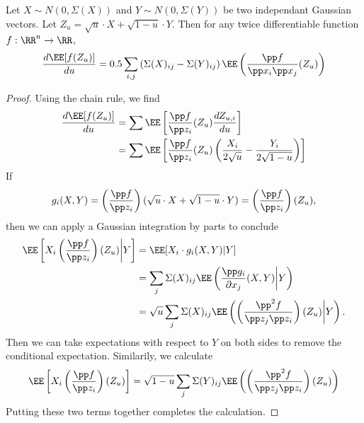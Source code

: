 \begin{lemma}
    Let $X \sim N(0,\Sigma(X))$ and $Y \sim N(0,\Sigma(Y))$ be two independant Gaussian vectors. Let $Z_u = \sqrt{u} \cdot X + \sqrt{1-u} \cdot Y$. Then for any twice differentiable function $f: \RR^n \to \RR$,
    \[ \frac{d \EE[f(Z_u)]}{du} = 0.5 \sum_{i,j} \left( \Sigma(X)_{ij} - \Sigma(Y)_{ij} \right) \EE \left( \frac{\pp f}{\pp x_i \pp x_j}(Z_u) \right) \]
\end{lemma}
\begin{proof}
    Using the chain rule, we find
    \begin{align*} 
        \frac{d \EE[f(Z_u)]}{du} &= \sum \EE \left[ \frac{\pp f}{\pp z_i}(Z_u) \frac{d Z_{u,i}}{du} \right]\\
        &= \sum \EE \left[ \frac{\pp f}{\pp z_i}(Z_u) \left( \frac{X_i}{2\sqrt{u}} - \frac{Y_i}{2 \sqrt{1 - u}} \right) \right]
    \end{align*}
    If
    \[ g_i(X,Y) = \left( \frac{\pp f}{\pp z_i} \right)(\sqrt{u} \cdot X + \sqrt{1 - u} \cdot Y) = \left( \frac{\pp f}{\pp z_i} \right)(Z_u), \]
    then we can apply a Gaussian integration by parts to conclude
    \begin{align*}
        \EE \left[X_i \left( \frac{\pp f}{\pp z_i} \right)(Z_u) \bigg| Y \right] &= \EE[X_i \cdot g_i(X,Y) | Y]\\
        &= \sum_j \Sigma(X)_{ij} \EE \left( \frac{\pp g_i}{\partial x_j}(X,Y) \bigg| Y \right)\\
        &= \sqrt{u} \sum_j \Sigma(X)_{ij} \EE \left( \left( \frac{\pp^2 f}{\pp z_j \pp z_i} \right)(Z_u) \bigg| Y \right).
    \end{align*}
    Then we can take expectations with respect to $Y$ on both sides to remove the conditional expectation. Similarily, we calculate
    \begin{align*}
        \EE \left[X_i \left( \frac{\pp f}{\pp z_i} \right)(Z_u) \right] = \sqrt{1 - u} \sum_j \Sigma(Y)_{ij} \EE \left( \left( \frac{\pp^2 f}{\pp z_j \pp z_i} \right)(Z_u) \right)
    \end{align*}
    Putting these two terms together completes the calculation.
\end{proof}

